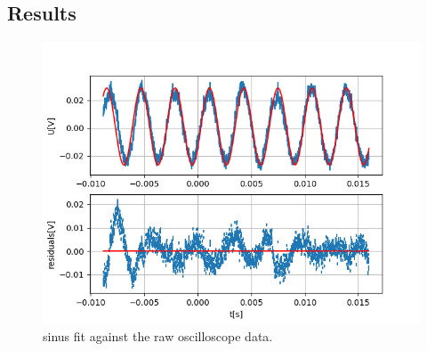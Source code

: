 \documentclass[12pt,a4paper]{article}
\begin{document}
\subsection{Results}

\begin{figure}
\centering
\includegraphics[scale=0.8]{Bilder/U_phi/fit.png}
\caption{sinus fit against the raw oscilloscope data.}
\label{fig:U-phi_fit}
\end{figure}
\end{document}
